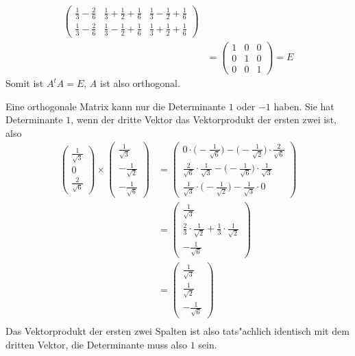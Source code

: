\begin{loesung}
\begin{teilaufgaben}
\begin{align*}
\begin{pmatrix}
\frac13-\frac26 & \frac13+\frac12+\frac16 & \frac13-\frac12+\frac16\\
\frac13-\frac26 & \frac13-\frac12+\frac16 & \frac13+\frac12+\frac16
\end{pmatrix}
\\
&=\begin{pmatrix}
1&0&0\\
0&1&0\\
0&0&1
\end{pmatrix}
=E
\end{align*}
Somit ist $A^tA=E$, $A$ ist also orthogonal.
\item
Eine orthogonale Matrix kann nur die Determinante $1$ oder $-1$ haben.
Sie hat Determinante $1$, wenn der dritte Vektor das Vektorprodukt der
ersten zwei ist, also
\begin{align*}
\begin{pmatrix}
\frac1{\sqrt{3}}\\0\\\frac{2}{\sqrt{6}}
\end{pmatrix}\times\begin{pmatrix}
\frac1{\sqrt{3}}\\-\frac1{\sqrt{2}}\\-\frac1{\sqrt{6}}
\end{pmatrix}
&=
\begin{pmatrix}
0\cdot\bigl(-\frac1{\sqrt{6}}\bigr)-\bigl(-\frac1{\sqrt{2}}\bigr)\cdot\frac2{\sqrt{6}}\\
\frac2{\sqrt{6}}\cdot\frac1{\sqrt{3}}-\bigl(-\frac1{\sqrt{6}} \bigr)\cdot\frac1{\sqrt{3}}\\
\frac1{\sqrt{3}}\cdot\bigl(-\frac1{\sqrt{2}}\bigr)-\frac1{\sqrt{3}}\cdot 0
\end{pmatrix}
\\
&=\begin{pmatrix}
\frac1{\sqrt{3}}\\
\frac23\cdot\frac1{\sqrt{2}}+\frac13\cdot\frac1{\sqrt{2}}\\
-\frac1{\sqrt{6}}
\end{pmatrix}
\\
&=\begin{pmatrix}
\frac1{\sqrt{3}}\\
\frac1{\sqrt{2}}\\
-\frac1{\sqrt{6}}
\end{pmatrix}
\\
\end{align*}
Das Vektorprodukt der ersten zwei Spalten ist also tats"achlich
identisch mit dem dritten Vektor, die Determinante muss also $1$ sein.


\end{teilaufgaben}
\end{loesung}
